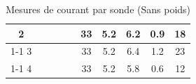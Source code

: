 \begin{table}[H]
{\begin{tabular}{|c|c|c|c|c|c|c|c|c|c|}
            2         &                                                            &                           &                                                         &                                                          & 33                                                      & 5.2                                                                 & 6.2                                                              & 0.9    & 18                                                                 \\ \cline{1-1} \cline{6-10}
            3         &                                                            &                           &                                                         &                                                          & 33                                                      & 5.2                                                                 & 6.4                                                              & 1.2    & 23                                                                 \\ \cline{1-1} \cline{6-10}
            4         &                                                            &                           &                                                         &                                                          & 33                                                      & 5.2                                                                 & 5.8                                                              & 0.6    & 12                                                                 \\ \hline
        \end{tabular}%
    }
    \caption{Mesures de courant par sonde (Sans poids)}
    \label{tab:sans_poids_sonde}
\end{table}

